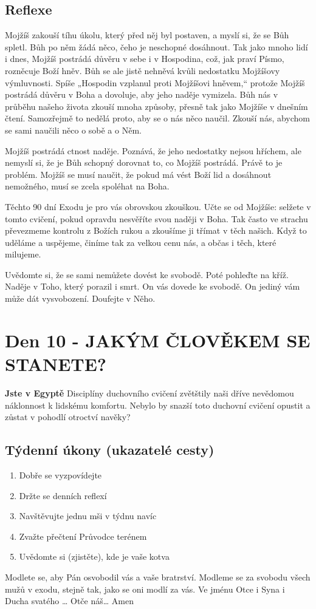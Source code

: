\documentclass[11pt]{article}
\newcommand{\zacatekDruhyTyden}{
  \textbf{Jste v Egyptě} \newline
  Disciplíny duchovního cvičení zvětštily naši dříve nevědomou náklonnost k lidskému komfortu.
  Nebylo by snazší toto duchovní cvičení opustit a zůstat v pohodlí otroctví navěky?

  \subsection*{Týdenní úkony (ukazatelé cesty)}
\begin{enumerate}
  \item Dobře se vyzpovídejte
  \item Držte se denních reflexí
  \item Navštěvujte jednu mši v týdnu navíc
  \item Zvažte přečtení Průvodce terénem
  \item Uvědomte si (zjistěte), kde je vaše kotva
\end{enumerate}
Modlete se, aby Pán osvobodil vás a vaše bratrství. \newline
Modleme se za svobodu všech mužů v exodu, stejně tak, jako se oni modlí za vás.\newline
Ve jménu Otce i Syna i Ducha svatého …  Otče náš… Amen
}
\begin{document}
\subsection*{Reflexe}
Mojžíš zakouší tíhu úkolu, který před něj byl postaven, a myslí si, že se Bůh spletl. Bůh po něm žádá něco,
čeho je neschopné dosáhnout. Tak jako mnoho lidí i dnes, Mojžíš postrádá důvěru v sebe i v Hospodina,
což, jak praví Písmo, rozněcuje Boží hněv. Bůh se ale jistě nehněvá kvůli nedostatku Mojžíšovy
výmluvnosti. Spíše „Hospodin vzplanul proti Mojžíšovi hněvem,“ protože Mojžíš postrádá důvěru v Boha
a dovoluje, aby jeho naděje vymizela. Bůh nás v průběhu našeho života zkouší mnoha způsoby, přesně tak
jako Mojžíše v dnešním čtení. Samozřejmě to nedělá proto, aby se o nás něco naučil. Zkouší nás, abychom
se sami naučili něco o sobě a o Něm.

Mojžíš postrádá ctnost naděje. Poznává, že jeho nedostatky nejsou hříchem, ale nemyslí si, že je Bůh
schopný dorovnat to, co Mojžíš postrádá. Právě to je problém. Mojžíš se musí naučit, že pokud má vést
Boží lid a dosáhnout nemožného, musí se zcela spoléhat na Boha.

Těchto 90 dní Exodu je pro vás obrovskou zkouškou. Učte se od Mojžíše: selžete v tomto cvičení, pokud
opravdu nesvěříte svou naději v Boha. Tak často ve strachu převezmeme kontrolu z Božích rukou a
zkoušíme ji třímat v těch našich. Když to uděláme a uspějeme, činíme tak za velkou cenu nás, a občas i
těch, které milujeme.

Uvědomte si, že se sami nemůžete dovést ke svobodě. Poté pohleďte na kříž. Naděje v Toho, který porazil
i smrt. On vás dovede ke svobodě. On jediný vám může dát vysvobození. Doufejte v Něho.

\newpage
\section{Den 10 - JAKÝM ČLOVĚKEM SE STANETE?}
\zacatekDruhyTyden
\end{document}
